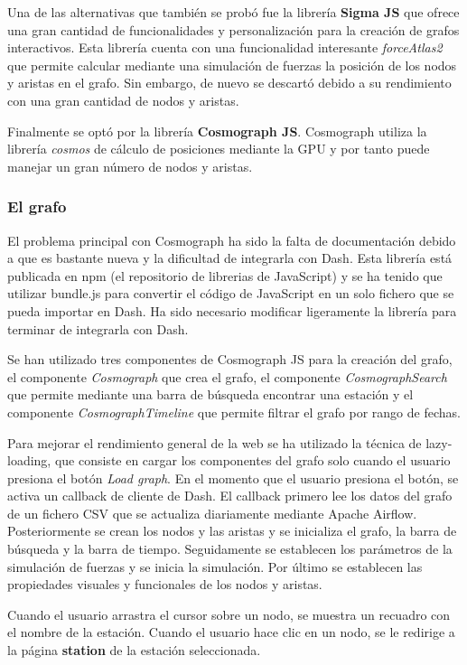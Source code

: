 Una de las alternativas que también se probó fue la librería \textbf{Sigma JS} que ofrece una gran cantidad de funcionalidades y personalización para la creación de grafos interactivos. Esta librería cuenta con una funcionalidad interesante \textit{forceAtlas2} que permite calcular mediante una simulación de fuerzas la posición de los nodos y aristas en el grafo. Sin embargo, de nuevo se descartó debido a su rendimiento con una gran cantidad de nodos y aristas.

Finalmente se optó por la librería \textbf{Cosmograph JS}. Cosmograph utiliza la librería \textit{cosmos} de cálculo de posiciones mediante la GPU y por tanto puede manejar un gran número de nodos y aristas.

\subsubsection*{El grafo}
El problema principal con Cosmograph ha sido la falta de documentación debido a que es bastante nueva y la dificultad de integrarla con Dash. Esta librería está publicada en npm (el repositorio de librerias de JavaScript) y se ha tenido que utilizar bundle.js para convertir el código de JavaScript en un solo fichero que se pueda importar en Dash. Ha sido necesario modificar ligeramente la librería para terminar de integrarla con Dash.

Se han utilizado tres componentes de Cosmograph JS para la creación del grafo, el componente \textit{Cosmograph} que crea el grafo, el componente \textit{CosmographSearch} que permite mediante una barra de búsqueda encontrar una estación y el componente \textit{CosmographTimeline} que permite filtrar el grafo por rango de fechas.

Para mejorar el rendimiento general de la web se ha utilizado la técnica de lazy-loading, que consiste en cargar los componentes del grafo solo cuando el usuario presiona el botón \textit{Load graph}. En el momento que el usuario presiona el botón, se activa un callback de cliente de Dash. El callback primero lee los datos del grafo de un fichero CSV que se actualiza diariamente mediante Apache Airflow. Posteriormente se crean los nodos y las aristas y se inicializa el grafo, la barra de búsqueda y la barra de tiempo. Seguidamente se establecen los parámetros de la simulación de fuerzas y se inicia la simulación. Por último se establecen las propiedades visuales y funcionales de los nodos y aristas.

Cuando el usuario arrastra el cursor sobre un nodo, se muestra un recuadro con el nombre de la estación. Cuando el usuario hace clic en un nodo, se le redirige a la página \textbf{station} de la estación seleccionada.

